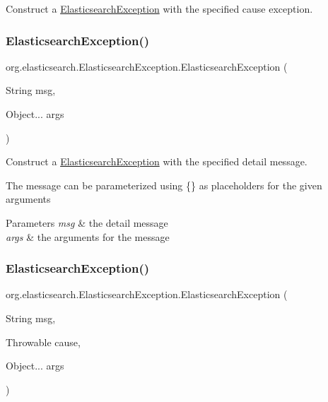Construct a {\ttfamily \hyperlink{classorg_1_1elasticsearch_1_1_elasticsearch_exception}{Elasticsearch\+Exception}} with the specified cause exception. \hypertarget{classorg_1_1elasticsearch_1_1_elasticsearch_exception_ae9bdc2247b5d219e66764dcf8ef4e7c6}{}\label{classorg_1_1elasticsearch_1_1_elasticsearch_exception_ae9bdc2247b5d219e66764dcf8ef4e7c6} 
\subsubsection{\texorpdfstring{Elasticsearch\+Exception()}{ElasticsearchException()}\hspace{0.1cm}{\footnotesize\ttfamily [2/3]}}
{\footnotesize\ttfamily org.\+elasticsearch.\+Elasticsearch\+Exception.\+Elasticsearch\+Exception (\begin{DoxyParamCaption}\item[{String}]{msg,  }\item[{Object...}]{args }\end{DoxyParamCaption})}

Construct a {\ttfamily \hyperlink{classorg_1_1elasticsearch_1_1_elasticsearch_exception}{Elasticsearch\+Exception}} with the specified detail message.

The message can be parameterized using {\ttfamily \{\}} as placeholders for the given arguments


\begin{DoxyParams}{Parameters}
{\em msg} & the detail message \\
\hline
{\em args} & the arguments for the message \\
\hline
\end{DoxyParams}
\hypertarget{classorg_1_1elasticsearch_1_1_elasticsearch_exception_a2202d9407b99327ee6af4af27d92f913}{}\label{classorg_1_1elasticsearch_1_1_elasticsearch_exception_a2202d9407b99327ee6af4af27d92f913} 
\subsubsection{\texorpdfstring{Elasticsearch\+Exception()}{ElasticsearchException()}\hspace{0.1cm}{\footnotesize\ttfamily [3/3]}}
{\footnotesize\ttfamily org.\+elasticsearch.\+Elasticsearch\+Exception.\+Elasticsearch\+Exception (\begin{DoxyParamCaption}\item[{String}]{msg,  }\item[{Throwable}]{cause,  }\item[{Object...}]{args }\end{DoxyParamCaption})}

